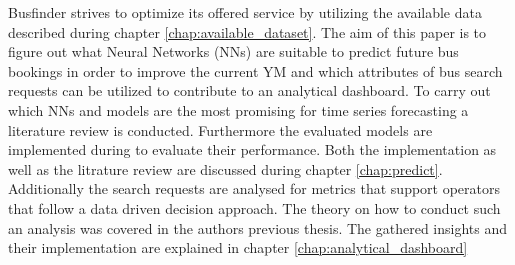 \newline
\newline
Busfinder strives to optimize its offered service by utilizing the available data described during chapter \ref{chap:available_dataset}. The aim of this paper is to figure out what Neural Networks (NNs) are suitable to predict future bus bookings in order to improve the current YM and which attributes of bus search requests can be utilized to contribute to an analytical dashboard. To carry out which NNs and models are the most promising for time series forecasting a literature review is conducted. Furthermore the evaluated models are implemented during to evaluate their performance. Both the implementation as well as the litrature review are discussed during chapter \ref{chap:predict}. Additionally the search requests are analysed for metrics that support operators that follow a data driven decision approach. The theory on how to conduct such an analysis was covered in the authors previous thesis. The gathered insights and their implementation are explained in chapter \ref{chap:analytical_dashboard}


